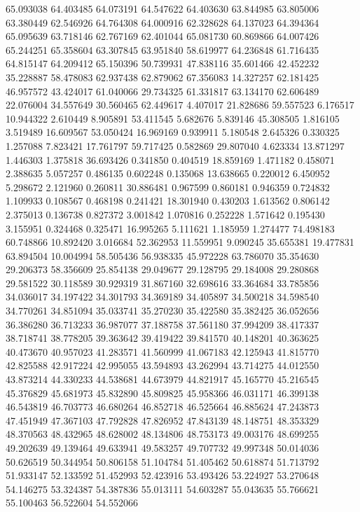 65.093038
64.403485
64.073191
64.547622
64.403630
63.844985
63.805006
63.380449
62.546926
64.764308
64.000916
62.328628
64.137023
64.394364
65.095639
63.718146
62.767169
62.401044
65.081730
60.869866
64.007426
65.244251
65.358604
63.307845
63.951840
58.619977
64.236848
61.716435
64.815147
64.209412
65.150396
50.739931
47.838116
35.601466
42.452232
35.228887
58.478083
62.937438
62.879062
67.356083
14.327257
62.181425
46.957572
43.424017
61.040066
29.734325
61.331817
63.134170
62.606489
22.076004
34.557649
30.560465
62.449617
4.407017
21.828686
59.557523
6.176517
10.944322
2.610449
8.905891
53.411545
5.682676
5.839146
45.308505
1.816105
3.519489
16.609567
53.050424
16.969169
0.939911
5.180548
2.645326
0.330325
1.257088
7.823421
17.761797
59.717425
0.582869
29.807040
4.623334
13.871297
1.446303
1.375818
36.693426
0.341850
0.404519
18.859169
1.471182
0.458071
2.388635
5.057257
0.486135
0.602248
0.135068
13.638665
0.220012
6.450952
5.298672
2.121960
0.260811
30.886481
0.967599
0.860181
0.946359
0.724832
1.109933
0.108567
0.468198
0.241421
18.301940
0.430203
1.613562
0.806142
2.375013
0.136738
0.827372
3.001842
1.070816
0.252228
1.571642
0.195430
3.155951
0.324468
0.325471
16.995265
5.111621
1.185959
1.274477
74.498183
60.748866
10.892420
3.016684
52.362953
11.559951
9.090245
35.655381
19.477831
63.894504
10.004994
58.505436
56.938335
45.972228
63.786070
35.354630
29.206373
58.356609
25.854138
29.049677
29.128795
29.184008
29.280868
29.581522
30.118589
30.929319
31.867160
32.698616
33.364684
33.785856
34.036017
34.197422
34.301793
34.369189
34.405897
34.500218
34.598540
34.770261
34.851094
35.033741
35.270230
35.422580
35.382425
36.052656
36.386280
36.713233
36.987077
37.188758
37.561180
37.994209
38.417337
38.718741
38.778205
39.363642
39.419422
39.841570
40.148201
40.363625
40.473670
40.957023
41.283571
41.560999
41.067183
42.125943
41.815770
42.825588
42.917224
42.995055
43.594893
43.262994
43.714275
44.012550
43.873214
44.330233
44.538681
44.673979
44.821917
45.165770
45.216545
45.376829
45.681973
45.832890
45.809825
45.958366
46.031171
46.399138
46.543819
46.703773
46.680264
46.852718
46.525664
46.885624
47.243873
47.451949
47.367103
47.792828
47.826952
47.843139
48.148751
48.353329
48.370563
48.432965
48.628002
48.134806
48.753173
49.003176
48.699255
49.202639
49.139464
49.633941
49.583257
49.707732
49.997348
50.014036
50.626519
50.344954
50.806158
51.104784
51.405462
50.618874
51.713792
51.933147
52.133592
51.452993
52.423916
53.493426
53.224927
53.270648
54.146275
53.324387
54.387836
55.013111
54.603287
55.043635
55.766621
55.100463
56.522604
54.552066
